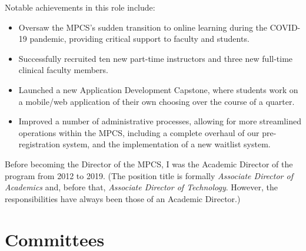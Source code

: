 \documentclass[11pt,letterpaper,sans]{moderncv}
\begin{document}
\medskip\noindent Notable achievements in this role include:

\begin{itemize}
 \item Oversaw the MPCS's sudden transition to online learning during the COVID-19 pandemic, providing critical support to faculty and students.
 \item Successfully recruited ten new part-time instructors and three new full-time clinical faculty members.
 \item Launched a new Application Development Capstone, where students work on a mobile/web application of their own choosing over the course of a quarter.
 \item Improved a number of administrative processes, allowing for more streamlined operations within the MPCS, including a complete overhaul of our pre-registration system, and the implementation of a new waitlist system.
\end{itemize}

\medskip
Before becoming the Director of the MPCS, I was the Academic Director of the program from 2012 to 2019. (The position title is formally \emph{Associate Director of Academics} and, before that, \emph{Associate Director of Technology}. However, the responsibilities have always been those of an Academic Director.)

\section{Committees}


\end{document}
